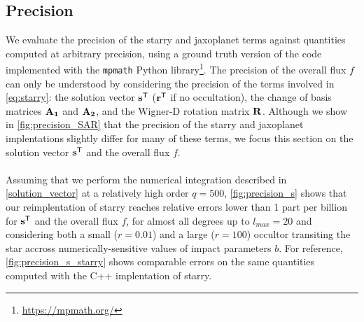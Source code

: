 \documentclass[modern]{aastex631}
\begin{document}
\subsection{Precision}\label{precision}
We evaluate the precision of the \textsf{starry} and \textsf{jaxoplanet} terms against quantities computed at arbitrary precision, using a ground truth version of the code implemented with the \texttt{mpmath} Python library\footnote{\href{https://mpmath.org/}{https://mpmath.org/}}. The precision of the overall flux $f$ can only be understood by considering the precision of the terms involved in \autoref{eq:starry}: the solution vector ${\mathbf{s}}^\mathsf{T}$ (${\mathbf{r}}^\mathsf{T}$ if no occultation), the change of basis matrices ${\mathbf{A_1}}$ and ${\mathbf{A_2}}$, and the Wigner-D rotation matrix ${\mathbf{R}}$. Although we show in \autoref{fig:precision_SAR} that the precision of the \textsf{starry} and \textsf{jaxoplanet} implentations slightly differ for many of these terms, we focus this section on the solution vector ${\mathbf{s}}^\mathsf{T}$ and the overall flux $f$.\\\\
Assuming that we perform the numerical integration described in \autoref{solution_vector} at a relatively high order $q=500$, \autoref{fig:precision_s} shows that our reimplentation of \textsf{starry} reaches relative errors lower than 1 part per billion for ${\mathbf{s}}^\mathsf{T}$ and the overall flux $f$, for almost all degrees up to $l_{max}=20$ and considering both a small ($r=0.01$) and a large ($r=100$) occultor transiting the star accross numerically-sensitive values of impact parameters $b$. For reference, \autoref{fig:precision_s_starry} shows comparable errors on the same quantities computed with the C++ implentation of \textsf{starry}. 
\end{document}
